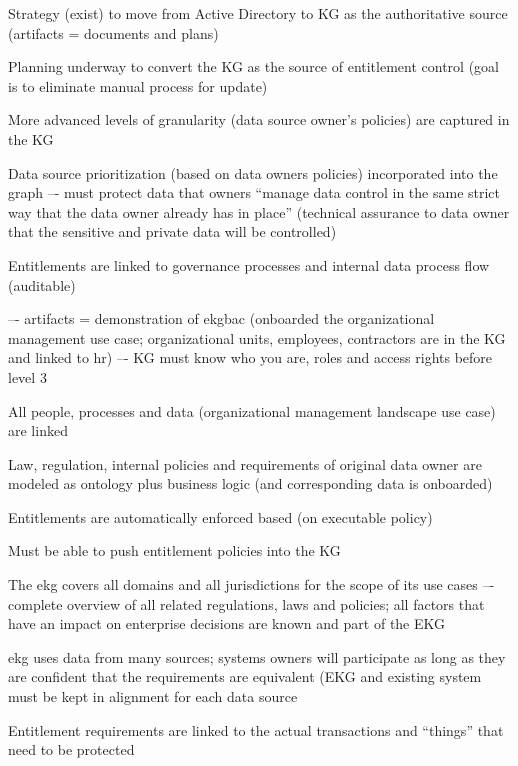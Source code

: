 \ekgmmscoringlevelTwo

\begin{scoring}

  \item Strategy (exist) to move from Active Directory to KG as the authoritative source
        (artifacts = documents and plans)
  \item Planning underway to convert the KG as the source of entitlement control
        (goal is to eliminate manual process for update)
  \item More advanced levels of granularity (data source owner’s policies) are captured in the KG
  \item Data source prioritization (based on data owners policies) incorporated into the graph –-
        must protect data that owners “manage data control in the same strict way that the data owner
        already has in place” (technical assurance to data owner that the sensitive and private data will be controlled)
  \item Entitlements are linked to governance processes and internal data process flow (auditable)

\end{scoring}

\ekgmmscoringlevelThree

\begin{scoring}

    \item {} –- artifacts = demonstration of \gls{ekgbac}
          (onboarded the organizational management use case; organizational units, employees, contractors are in
          the KG and linked to \gls{hr}) –- KG must know who you are, roles and access rights before level 3
    \item All people, processes and data (organizational management landscape use case) are linked
    \item Law, regulation, internal policies and requirements of original data owner are modeled as ontology
          plus business logic (and corresponding data is onboarded)
    \item Entitlements are automatically enforced based (on executable policy)
    \item Must be able to push entitlement policies into the KG
    \item The \gls{ekg} covers all domains and all jurisdictions for the scope of its use cases –-
          complete overview of all related regulations, laws and policies;
          all factors that have an impact on enterprise decisions are known and part of the EKG
    \item \gls{ekg} uses data from many sources; systems owners will participate as long as they are confident that
          the requirements are equivalent (EKG and existing system must be kept in alignment for each data source
    \item Entitlement requirements are linked to the actual transactions and “things” that need to be protected

\end{scoring}

